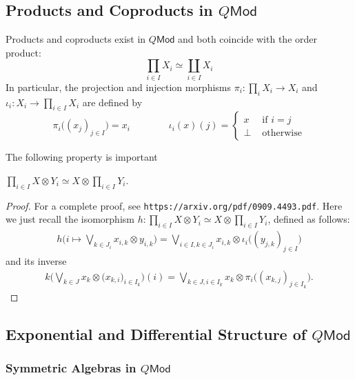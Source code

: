 \subsection{Products and Coproducts in $Q\mathsf{Mod}$}

Products and coproducts exist in $Q\mathsf{Mod}$ and both coincide with the order product:
$$
\prod_{i\in I}X_{i} \simeq \coprod_{i\in I}X_{i}
$$
In particular, the projection and
 injection morphisms $\pi_{i}:\prod_{i}X_{i}\to X_{i}$ and $\iota_{i}:X_{i} \to \prod_{i\in I}X_{i}$ are defined by 
$$
\pi_{i}\big( (x_{j})_{j\in I}\big) = x_{i} \qquad \qquad
\iota_{i}(x)({j})= \begin{cases} x & \text{ if }i=j\\ \bot & \text{ otherwise}\end{cases}
$$



The following property is important
\begin{proposition}\label{prop:productvstensor}
$\prod_{i\in I} X\otimes Y_{i} \simeq X \otimes \prod_{i\in I}Y_{i}$.
\end{proposition}
\begin{proof}
For a complete proof, see \texttt{https://arxiv.org/pdf/0909.4493.pdf}. Here we just recall the isomorphism 
$h: \prod_{i\in I} X\otimes Y_{i} \simeq X \otimes \prod_{i\in I}Y_{i}$, defined as follows:
\begin{align*}
h\Big( i\mapsto \bigvee_{k\in J_{i}}x_{i,k}\otimes y_{i,k}\Big ) = 
\bigvee_{i\in I,k\in J_{i}}x_{i,k} \otimes \iota_{i}\big( (y_{j,k})_{j\in I}\big)
\end{align*}
and its inverse
\begin{align*}
k\Big( \bigvee_{k\in J}x_{k}\otimes \big(x_{k,i}\big)_{i\in I_{k}}\Big)(i)=
\bigvee_{k\in J,i\in I_{k}}x_{k}\otimes \pi_{i}\big((x_{k,j})_{j\in I_{k}}\big).
\end{align*}
\end{proof}



\subsection{Exponential and Differential Structure of $Q\mathsf{Mod}$}

\subsubsection{Symmetric Algebras in $Q\mathsf{Mod}$ }

